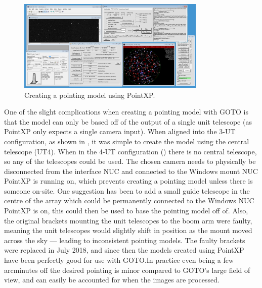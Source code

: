\begin{colsection}
\begin{colsection}
\begin{figure}[t]
    \begin{center}
        \includegraphics[width=0.8\textwidth]{images/pointing_model.png}
    \end{center}
    \caption[Creating a pointing model using PointXP]{
        Creating a pointing model using PointXP.\@
    }\label{fig:pointing_model}
\end{figure}

One of the slight complications when creating a pointing model with GOTO is that the model can only be based off of the output of a single unit telescope (as PointXP only expects a single camera input). When aligned into the 3-UT configuration, as shown in , it was simple to create the model using the central telescope (UT4). When in the 4-UT configuration () there is no central telescope, so any of the telescopes could be used. The chosen camera needs to physically be disconnected from the interface NUC and connected to the Windows mount NUC PointXP is running on, which prevents creating a pointing model unless there is someone on-site. One suggestion has been to add a small guide telescope in the centre of the array which could be permanently connected to the Windows NUC PointXP is on, this could then be used to base the pointing model off of. Also, the original brackets mounting the unit telescopes to the boom arm were faulty, meaning the unit telescopes would slightly shift in position as the mount moved across the sky --- leading to inconsistent pointing models. The faulty brackets were replaced in July 2018, and since then the models created using PointXP have been perfectly good for use with GOTO.\@ In practice even being a few arcminutes off the desired pointing is minor compared to GOTO's large field of view, and can easily be accounted for when the images are processed.


\end{colsection}
\end{colsection}
